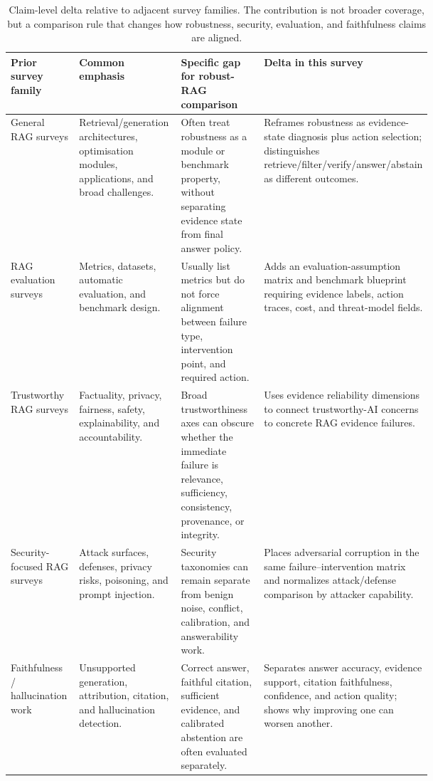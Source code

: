 \begin{table}[t]
\centering
\scriptsize
\renewcommand{\arraystretch}{0.92}
\begin{tabularx}{\linewidth}{>{\raggedright\arraybackslash}p{0.18\linewidth}>{\raggedright\arraybackslash}p{0.26\linewidth}>{\raggedright\arraybackslash}p{0.25\linewidth}X}
\toprule
\textbf{Prior survey family} & \textbf{Common emphasis} & \textbf{Specific gap for robust-RAG comparison} & \textbf{Delta in this survey} \\
\midrule
General RAG surveys & Retrieval/generation architectures, optimisation modules, applications, and broad challenges. & Often treat robustness as a module or benchmark property, without separating evidence state from final answer policy. & Reframes robustness as evidence-state diagnosis plus action selection; distinguishes retrieve/filter/verify/answer/abstain as different outcomes. \\
RAG evaluation surveys & Metrics, datasets, automatic evaluation, and benchmark design. & Usually list metrics but do not force alignment between failure type, intervention point, and required action. & Adds an evaluation-assumption matrix and benchmark blueprint requiring evidence labels, action traces, cost, and threat-model fields. \\
Trustworthy RAG surveys & Factuality, privacy, fairness, safety, explainability, and accountability. & Broad trustworthiness axes can obscure whether the immediate failure is relevance, sufficiency, consistency, provenance, or integrity. & Uses evidence reliability dimensions to connect trustworthy-AI concerns to concrete RAG evidence failures. \\
Security-focused RAG surveys & Attack surfaces, defenses, privacy risks, poisoning, and prompt injection. & Security taxonomies can remain separate from benign noise, conflict, calibration, and answerability work. & Places adversarial corruption in the same failure--intervention matrix and normalizes attack/defense comparison by attacker capability. \\
Faithfulness / hallucination work & Unsupported generation, attribution, citation, and hallucination detection. & Correct answer, faithful citation, sufficient evidence, and calibrated abstention are often evaluated separately. & Separates answer accuracy, evidence support, citation faithfulness, confidence, and action quality; shows why improving one can worsen another. \\
\bottomrule
\end{tabularx}
\caption{Claim-level delta relative to adjacent survey families. The contribution is not broader coverage, but a comparison rule that changes how robustness, security, evaluation, and faithfulness claims are aligned.}
\label{tab:survey-delta}
\end{table}

